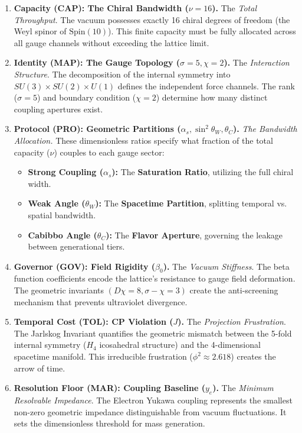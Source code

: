 \begin{enumerate}
    \item \textbf{Capacity (CAP): The Chiral Bandwidth ($\nu = 16$).} 
    The \textit{Total Throughput}. The vacuum possesses exactly 16 chiral degrees of freedom (the Weyl spinor of $\text{Spin}(10)$). This finite capacity must be fully allocated across all gauge channels without exceeding the lattice limit.
    
    \item \textbf{Identity (MAP): The Gauge Topology ($\sigma=5, \chi=2$).} 
    The \textit{Interaction Structure}. The decomposition of the internal symmetry into $SU(3) \times SU(2) \times U(1)$ defines the independent force channels. The rank ($\sigma=5$) and boundary condition ($\chi=2$) determine how many distinct coupling apertures exist.
    
    \item \textbf{Protocol (PRO): Geometric Partitions  ($\alpha_s, \sin^2\theta_W, \theta_C$).}
    \textit{The Bandwidth Allocation.} These dimensionless ratios specify what fraction of the total capacity ($\nu$) couples to each gauge sector:
    \begin{itemize}
        \item \textbf{Strong Coupling ($\alpha_s$):} The \textbf{Saturation Ratio}, utilizing the full chiral width.
        \item \textbf{Weak Angle ($\theta_W$):} The \textbf{Spacetime Partition}, splitting temporal vs. spatial bandwidth.
        \item \textbf{Cabibbo Angle ($\theta_C$):} The \textbf{Flavor Aperture}, governing the leakage between generational tiers.
    \end{itemize}
    
    \item \textbf{Governor (GOV): Field Rigidity ($\beta_0$).} 
    The \textit{Vacuum Stiffness}. The beta function coefficients encode the lattice's resistance to gauge field deformation. The geometric invariants $(D\chi=8, \sigma-\chi=3)$ create the anti-screening mechanism that prevents ultraviolet divergence.
    
    \item \textbf{Temporal Cost (TOL): CP Violation ($J$).} 
    The \textit{Projection Frustration}. The Jarlskog Invariant quantifies the geometric mismatch between the 5-fold internal symmetry ($H_4$ icosahedral structure) and the 4-dimensional spacetime manifold. This irreducible frustration ($\phi^2 \approx 2.618$) creates the arrow of time.
    
    \item \textbf{Resolution Floor (MAR): Coupling Baseline ($y_e$).} 
    The \textit{Minimum Resolvable Impedance}. The Electron Yukawa coupling represents the smallest non-zero geometric impedance distinguishable from vacuum fluctuations. It sets the dimensionless threshold for mass generation.
\end{enumerate}

